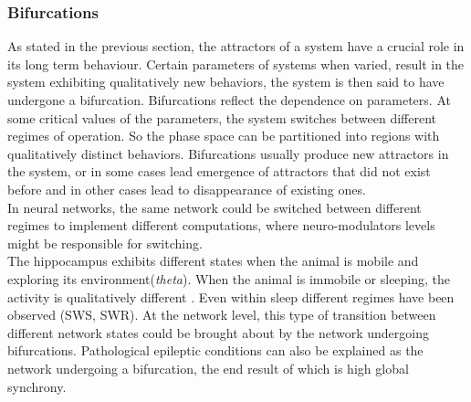 
\subsubsection{Bifurcations}
As stated in the previous section, the attractors of a system have a crucial role in its long term behaviour. Certain parameters of systems when varied, result in the system exhibiting qualitatively new behaviors, the system is then said to have undergone a bifurcation. Bifurcations reflect the dependence on parameters. At some critical values of the parameters, the system switches between different regimes of operation. So the phase space can be partitioned into regions with qualitatively distinct behaviors. Bifurcations usually produce new attractors in the system, or in some cases lead emergence of attractors that did not exist before and in other cases lead to disappearance of existing ones. \\
In neural networks, the same network could be switched between different regimes to implement different computations, where neuro-modulators levels might be responsible for switching.\\
The hippocampus exhibits different states when the animal is mobile and exploring its environment(\emph{theta}). When the animal is immobile or sleeping, the activity is qualitatively different \cite{Buzsaki2011,  Montgomery2008}. Even within sleep different regimes have been observed (SWS, SWR). 
At the network level, this type of transition between different network states could be brought about by the network undergoing bifurcations. Pathological epileptic conditions can also be explained as the network undergoing a bifurcation, the end result of which is high global synchrony. 

%

